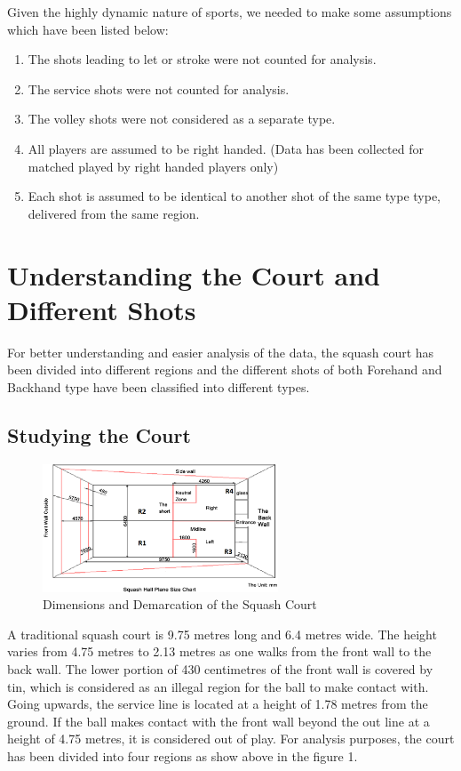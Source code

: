 \documentclass[10pt,conference]{IEEEtran}
\begin{document}
Given the highly dynamic nature of sports, we needed to make some assumptions which have been listed below:
\begin{enumerate}
    \item The shots leading to let or stroke were not counted for analysis.
    \item The service shots were not counted for analysis.
    \item The volley shots were not considered as a separate type.
    \item All players are assumed to be right handed. (Data has been collected for matched played by right handed players only)
    \item Each shot is assumed to be identical to another shot of the same type type, delivered from the same region.
\end{enumerate}
\section{Understanding the Court and Different Shots}
\label{sec:model}


 For better understanding and easier analysis of the data, the squash court has been divided into different regions and the different shots of both Forehand and Backhand type have been classified into different types.

\subsection{Studying the Court}
\begin{figure}[h!]
\centering
\includegraphics[height=1.5in]{SOP_SQUASH_COURT}
\caption{Dimensions and Demarcation of the Squash Court}
\label{fig:squash_court}
\end{figure}
A traditional squash court is 9.75 metres long and 6.4 metres wide. The height varies from 4.75 metres to 2.13 metres as one walks from the front wall to the back wall. 
The lower portion of 430 centimetres of the front wall is covered by tin, which is considered as an illegal region for the ball to make contact with. Going upwards, the service line is located at a height of 1.78 metres from  the ground. If the ball makes contact with the front wall beyond the out line at a height of 4.75 metres, it is considered out of play.
For analysis purposes, the court has been divided into four regions as show above in the figure 1.
\end{document}
